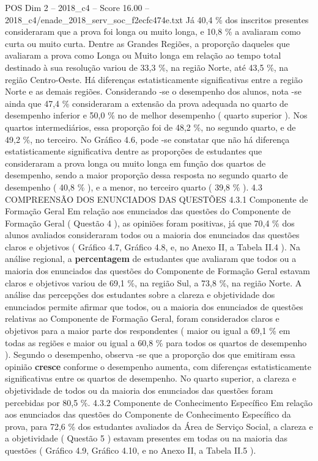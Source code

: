 \begin{textsample}{POS Dim 2 – 2018\_c4 – Score 16.00 – 2018\_c4/enade\_2018\_serv\_soc\_f2ecfc474e.txt}
Já 40,4 \% dos inscritos presentes consideraram que a prova foi longa ou muito longa, e 10,8 \% a avaliaram como curta ou muito curta.
Dentre as Grandes Regiões, a proporção daqueles que avaliaram a prova como Longa ou Muito longa em relação ao tempo total destinado à sua resolução variou de 33,3 \%, na região Norte, até 43,5 \%, na região Centro-Oeste.
Há diferenças estatisticamente significativas entre a região Norte e as demais regiões.
Considerando -se o desempenho dos alunos, nota -se ainda que 47,4 \% consideraram a extensão da prova adequada no quarto de desempenho inferior e 50,0 \% no de melhor desempenho ( quarto superior ).
Nos quartos intermediários, essa proporção foi de 48,2 \%, no segundo quarto, e de 49,2 \%, no terceiro.
No Gráfico 4.6, pode -se constatar que não há diferença estatisticamente significativa dentre as proporções de estudantes que consideraram a prova longa ou muito longa em função dos quartos de desempenho, sendo a maior proporção dessa resposta no segundo quarto de desempenho ( 40,8 \% ), e a menor, no terceiro quarto ( 39,8 \% ). 4.3 COMPREENSÃO DOS ENUNCIADOS DAS QUESTÕES 4.3.1 Componente de Formação Geral Em relação aos enunciados das questões do Componente de Formação Geral ( Questão 4 ), as opiniões foram positivas, já que 70,4 \% dos alunos avaliados consideraram todos ou a maioria dos enunciados das questões claros e objetivos ( Gráfico 4.7, Gráfico 4.8, e, no Anexo II, a Tabela II.4 ).
Na análise regional, a \textbf{percentagem} de estudantes que avaliaram que todos ou a maioria dos enunciados das questões do Componente de Formação Geral estavam claros e objetivos variou de 69,1 \%, na região Sul, a 73,8 \%, na região Norte.
A análise das percepções dos estudantes sobre a clareza e objetividade dos enunciados permite afirmar que todos, ou a maioria dos enunciados de questões relativas ao Componente de Formação Geral, foram considerados claros e objetivos para a maior parte dos respondentes ( maior ou igual a 69,1 \% em todas as regiões e maior ou igual a 60,8 \% para todos os quartos de desempenho ).
Segundo o desempenho, observa -se que a proporção dos que emitiram essa opinião \textbf{cresce} conforme o desempenho aumenta, com diferenças estatisticamente significativas entre os quartos de desempenho.
No quarto superior, a clareza e objetividade de todos ou da maioria dos enunciados das questões foram percebidas por 80,5 \%. 4.3.2 Componente de Conhecimento Específico Em relação aos enunciados das questões do Componente de Conhecimento Específico da prova, para 72,6 \% dos estudantes avaliados da Área de Serviço Social, a clareza e a objetividade ( Questão 5 ) estavam presentes em todas ou na maioria das questões ( Gráfico 4.9, Gráfico 4.10, e no Anexo II, a Tabela II.5 ).

\end{textsample}
